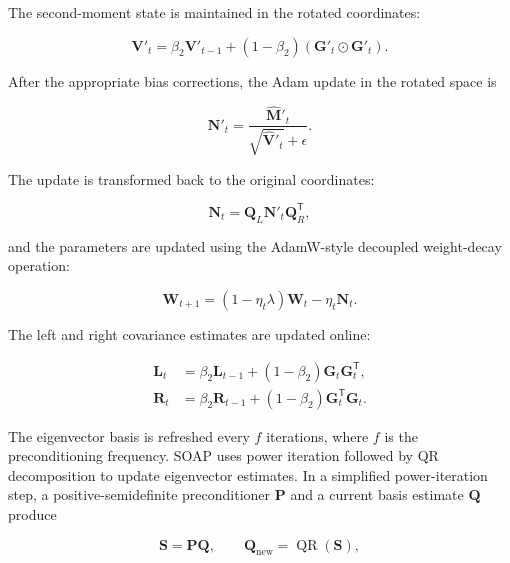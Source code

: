 The second-moment state is maintained in the rotated coordinates:

\begin{equation}
    \mathbf{V}'_t
    =
    \beta_2\mathbf{V}'_{t-1}
    +(1-\beta_2)
    (\mathbf{G}'_t\odot\mathbf{G}'_t).
    \label{eq:opt-soap-second-moment}
\end{equation}

After the appropriate bias corrections, the Adam update in the rotated
space is

\begin{equation}
    \mathbf{N}'_t
    =
    \frac{\widehat{\mathbf{M}}'_t}
    {\sqrt{\widehat{\mathbf{V}}'_t}+\epsilon}.
    \label{eq:opt-soap-adam-rotated}
\end{equation}

The update is transformed back to the original coordinates:

\begin{equation}
    \mathbf{N}_t
    =
    \mathbf{Q}_{L}
    \mathbf{N}'_t
    \mathbf{Q}_{R}^{\mathsf{T}},
    \label{eq:opt-soap-inverse-rotation}
\end{equation}

and the parameters are updated using the AdamW-style decoupled
weight-decay operation:

\begin{equation}
    \mathbf{W}_{t+1}
    =
    (1-\eta_t\lambda)\mathbf{W}_t
    -
    \eta_t\mathbf{N}_t.
    \label{eq:opt-soap-update}
\end{equation}

The left and right covariance estimates are updated online:

\begin{align}
    \mathbf{L}_t
    &=
    \beta_2\mathbf{L}_{t-1}
    +(1-\beta_2)\mathbf{G}_t\mathbf{G}_t^{\mathsf{T}},
    \label{eq:opt-soap-running-L}\\
    \mathbf{R}_t
    &=
    \beta_2\mathbf{R}_{t-1}
    +(1-\beta_2)\mathbf{G}_t^{\mathsf{T}}\mathbf{G}_t.
    \label{eq:opt-soap-running-R}
\end{align}

The eigenvector basis is refreshed every $f$ iterations, where $f$ is
the preconditioning frequency. SOAP uses power iteration followed by
QR decomposition to update eigenvector estimates. In a simplified
power-iteration step, a positive-semidefinite preconditioner
$\mathbf{P}$ and a current basis estimate $\mathbf{Q}$ produce

\begin{equation}
    \mathbf{S}=\mathbf{P}\mathbf{Q},
    \qquad
    \mathbf{Q}_{\mathrm{new}}
    =
    \operatorname{QR}(\mathbf{S}),
    \label{eq:opt-soap-power-qr}
\end{equation}

